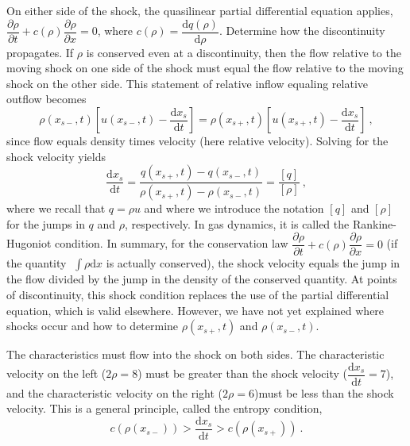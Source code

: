 \documentclass[12pt,a4paper]{article}
\newcommand{\dif}{\mathrm{d}}
\begin{document}
On either side of the shock, the quasilinear partial differential equation applies, $\dfrac{\partial \rho}{\partial t} + c(\rho) \dfrac{\partial \rho}{\partial x} = 0$, where $c(\rho) = \dfrac{\dif q(\rho)}{\dif \rho}$. Determine how the discontinuity propagates. If $\rho$ is conserved even at a discontinuity, then the flow relative to the moving shock on one side of the shock must equal the flow relative to the moving shock on the other side. This statement of relative inflow equaling relative outflow becomes
\begin{equation}
\rho(x_{s-}, t) \left[u(x_{s-}, t) - \dfrac{\dif x_s}{\dif t} \right] = \rho(x_{s+}, t) \left[u(x_{s+}, t) - \dfrac{\dif x_s}{\dif t} \right] ~,
\end{equation}
since flow equals density times velocity (here relative velocity). Solving for the shock velocity yields
\begin{equation}
\dfrac{\dif x_s}{\dif t} = \dfrac{q(x_{s+}, t) -q(x_{s-}, t)}{\rho(x_{s+}, t) -\rho(x_{s-}, t)} = \dfrac{[q]}{[\rho]} ~,
\end{equation}
where we recall that $q = \rho u$ and where we introduce the notation $[q]$ and $[\rho]$ for the jumps in $q$ and $\rho$, respectively. In gas dynamics, it is called the Rankine-Hugoniot condition. In summary, for the conservation law $\dfrac{\partial \rho}{\partial t} + c(\rho) \dfrac{\partial \rho}{\partial x} = 0$ (if the quantity 􏳭$\int \rho \dif x$ is actually conserved), the shock velocity equals the jump in the flow divided by the jump in the density of the conserved quantity. At points of discontinuity, this shock condition replaces the use of the partial differential equation, which is valid elsewhere. However, we have not yet explained where shocks occur and how to determine $\rho(x_{s+}, t)$ and $\rho(x_{s-}, t)$. 







The characteristics must flow into the shock on both sides. The characteristic velocity on the left ($2\rho = 8$) must be greater than the shock velocity ($\dfrac{\dif x_s}{\dif t} = 7$), and the characteristic velocity on the right ($2\rho = 6$)must be less than the shock velocity. This is a general principle, called the entropy condition,
\begin{equation}
c(\rho(x_{s-})) > \dfrac{\dif x_s}{\dif t} > c(\rho(x_{s+})) ~.
\end{equation}
\end{document}
